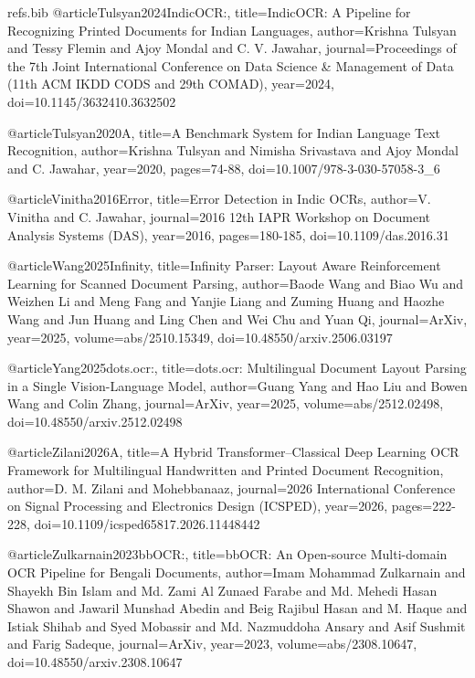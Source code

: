 \begin{filecontents}{refs.bib}
    @article{Tulsyan2024IndicOCR:,
    title={IndicOCR: A Pipeline for Recognizing Printed Documents for Indian Languages},
    author={Krishna Tulsyan and Tessy Flemin and Ajoy Mondal and C. V. Jawahar},
    journal={Proceedings of the 7th Joint International Conference on Data Science & Management of Data (11th ACM IKDD CODS and 29th COMAD)},
    year={2024},
    doi={10.1145/3632410.3632502}
    }
    
    @article{Tulsyan2020A,
    title={A Benchmark System for Indian Language Text Recognition},
    author={Krishna Tulsyan and Nimisha Srivastava and Ajoy Mondal and C. Jawahar},
    year={2020},
    pages={74-88},
    doi={10.1007/978-3-030-57058-3_6}
    }
    
    @article{Vinitha2016Error,
    title={Error Detection in Indic OCRs},
    author={V. Vinitha and C. Jawahar},
    journal={2016 12th IAPR Workshop on Document Analysis Systems (DAS)},
    year={2016},
    pages={180-185},
    doi={10.1109/das.2016.31}
    }
    
    @article{Wang2025Infinity,
    title={Infinity Parser: Layout Aware Reinforcement Learning for Scanned Document Parsing},
    author={Baode Wang and Biao Wu and Weizhen Li and Meng Fang and Yanjie Liang and Zuming Huang and Haozhe Wang and Jun Huang and Ling Chen and Wei Chu and Yuan Qi},
    journal={ArXiv},
    year={2025},
    volume={abs/2510.15349},
    doi={10.48550/arxiv.2506.03197}
    }
    
    @article{Yang2025dots.ocr:,
    title={dots.ocr: Multilingual Document Layout Parsing in a Single Vision-Language Model},
    author={Guang Yang and Hao Liu and Bowen Wang and Colin Zhang},
    journal={ArXiv},
    year={2025},
    volume={abs/2512.02498},
    doi={10.48550/arxiv.2512.02498}
    }
    
    @article{Zilani2026A,
    title={A Hybrid Transformer–Classical Deep Learning OCR Framework for Multilingual Handwritten and Printed Document Recognition},
    author={D. M. Zilani and Mohebbanaaz},
    journal={2026 International Conference on Signal Processing and Electronics Design (ICSPED)},
    year={2026},
    pages={222-228},
    doi={10.1109/icsped65817.2026.11448442}
    }
    
    @article{Zulkarnain2023bbOCR:,
    title={bbOCR: An Open-source Multi-domain OCR Pipeline for Bengali Documents},
    author={Imam Mohammad Zulkarnain and Shayekh Bin Islam and Md. Zami Al Zunaed Farabe and Md. Mehedi Hasan Shawon and Jawaril Munshad Abedin and Beig Rajibul Hasan and M. Haque and Istiak Shihab and Syed Mobassir and Md. Nazmuddoha Ansary and Asif Sushmit and Farig Sadeque},
    journal={ArXiv},
    year={2023},
    volume={abs/2308.10647},
    doi={10.48550/arxiv.2308.10647}
    }
    \end{filecontents}
    
